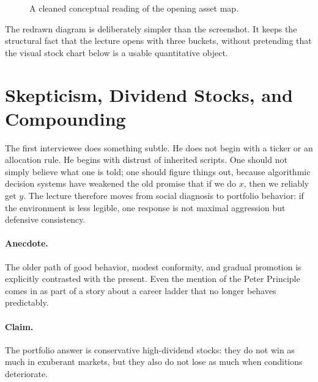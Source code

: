 \begin{figure}[htbp]
\centering
{}
\caption{A cleaned conceptual reading of the opening asset map.}
\end{figure}

The redrawn diagram is deliberately simpler than the screenshot. It keeps the structural fact that the lecture opens with three buckets, without pretending that the visual stock chart below is a usable quantitative object.

\section{Skepticism, Dividend Stocks, and Compounding}

The first interviewee does something subtle. He does not begin with a ticker or an allocation rule. He begins with distrust of inherited scripts. One should not simply believe what one is told; one should figure things out, because algorithmic decision systems have weakened the old promise that if we do \(x\), then we reliably get \(y\). The lecture therefore moves from social diagnosis to portfolio behavior: if the environment is less legible, one response is not maximal aggression but defensive consistency.

\paragraph{Anecdote.}
The older path of good behavior, modest conformity, and gradual promotion is explicitly contrasted with the present. Even the mention of the Peter Principle comes in as part of a story about a career ladder that no longer behaves predictably.

\paragraph{Claim.}
The portfolio answer is conservative high-dividend stocks: they do not win as much in exuberant markets, but they also do not lose as much when conditions deteriorate.

